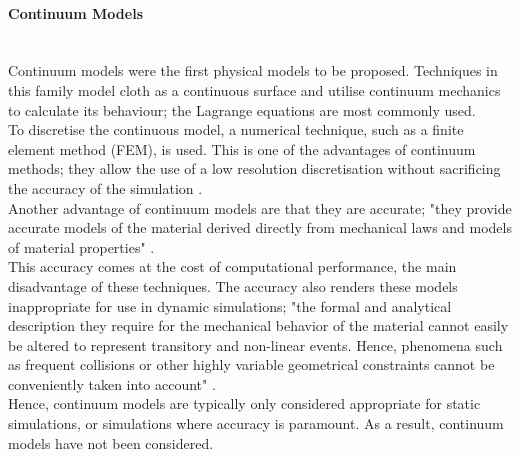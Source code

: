 \paragraph{Continuum Models}\leavevmode\\
Continuum models were the first physical models to be proposed. Techniques in this family model cloth as a continuous surface and utilise continuum mechanics to calculate its behaviour; the Lagrange equations are most commonly used.
\\To discretise the continuous model, a numerical technique, such as a finite element method (FEM), is used. This is one of the advantages of continuum methods; they allow the use of a low resolution discretisation without sacrificing the accuracy of the simulation \parencite{Wacker2005a}.
\\Another advantage of continuum models are that they are accurate; "they provide accurate models of the material derived directly from mechanical laws and models of material properties" \parencite[200]{Magnenat-Thalmann2006}.
\\This accuracy comes at the cost of computational performance, the main disadvantage of these techniques. The accuracy also renders these models inappropriate for use in dynamic simulations; "the formal and analytical description they require for the mechanical behavior of the material cannot easily be altered to represent transitory and non-linear events. Hence, phenomena such as frequent collisions or other highly variable geometrical constraints cannot be conveniently taken into account" \parencite[200]{Magnenat-Thalmann2006}. 
\\Hence, continuum models are typically only considered appropriate for static simulations, or simulations where accuracy is paramount. As a result, continuum models have not been considered.

